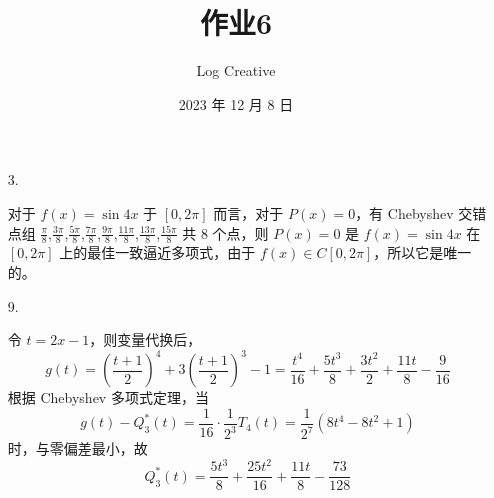 \documentclass{sjtuarticle}
\title{作业6}
\author{Log Creative}
\date{2023 年 12 月 8 日}
\begin{document}
\maketitle


\begin{itemize}
    \item[3.] \begin{solution}
        对于 $f(x)=\sin 4x$ 于 $[0,2\pi]$ 而言，对于 $P(x)=0$，有 Chebyshev 交错点组 $\frac{\pi}{8}$,$\frac{3\pi}{8}$,$\frac{5\pi}{8}$,$\frac{7\pi}{8}$,$\frac{9\pi}{8}$,$\frac{11\pi}{8}$,$\frac{13\pi}{8}$,$\frac{15\pi}{8}$ 共 8 个点，则 $P(x)=0$ 是 $f(x)=\sin 4x$ 在 $[0,2\pi]$ 上的最佳一致逼近多项式，由于 $f(x)\in C[0,2\pi]$，所以它是唯一的。
        
    \end{solution}
    \item[9.] \begin{solution}
        令 $t=2x-1$，则变量代换后，
        \begin{equation*}
            g(t)=\left(\frac{t+1}{2}\right)^4+3\left(\frac{t+1}{2}\right)^3-1=\frac{t^{4}}{16} + \frac{5 t^{3}}{8} + \frac{3 t^{2}}{2} + \frac{11 t}{8} - \frac{9}{16}
        \end{equation*}
        根据 Chebyshev 多项式定理，当
        \begin{equation*}
            g(t)-Q^*_3(t)=\frac{1}{16}\cdot\frac{1}{2^3}T_4(t)=\frac{1}{2^7}(8t^4-8t^2+1)
        \end{equation*}
        时，与零偏差最小，故
        \begin{equation*}
            Q^*_3(t)=\frac{5 t^{3}}{8} + \frac{25 t^{2}}{16} + \frac{11 t}{8} - \frac{73}{128}

\end{equation*}
\end{solution}
\end{itemize}
\end{document}
